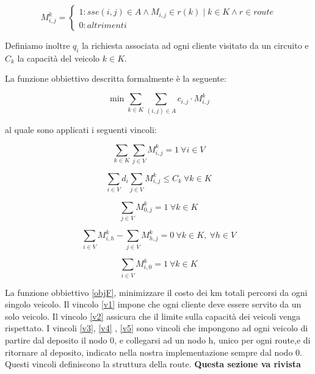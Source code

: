 \documentclass[]{article}
\begin{document}
\[M_{i,j}^k = \left\{
\begin{array}{lr}
1 :sse (i,j) \in A \wedge M_{i,j} \in  r(k) \mid k \in K \wedge r \in route\\
0 :altrimenti
\end{array}
\right.
\]

Definiamo inoltre \emph{$q_{i}$} la richiesta associata ad ogni cliente visitato da un circuito e \emph{$C_{k}$} la capacità del veicolo \emph{$k \in K$}.

La funzione obbiettivo descritta formalmente è la seguente:

\begin{equation} \label{objF}
\min \sum_{k \in K} \sum_{(i,j) \in A} c_{i,j} \cdot M_{i,j}^k 
\end{equation}



al quale sono applicati i seguenti vincoli:

\begin{equation} \label{v1}
 \sum_{k \in K} \sum_{j \in V} M_{i,j}^k = 1 \ \forall i \in V
\end{equation}

\begin{equation} \label{v2}
\sum_{i \in V} d_{i} \sum_{j \in V} M_{i,j}^k \leq C_{k} \ \forall k \in K
\end{equation}

\begin{equation} \label{v3}
\sum_{j \in V} M_{0,j}^k = 1 \ \forall k \in K
\end{equation}

\begin{equation} \label{v4}
\sum_{i \in V} M_{i,h}^k - \sum_{j \in V} M_{h,j}^k = 0 \ \forall k \in K ,\  \forall h \in V
\end{equation}

\begin{equation} \label{v5}
\sum_{i \in V} M_{i,0}^k = 1 \ \forall k \in K
\end{equation}




La funzione obbiettivo \ref{objF}, minimizzare il costo dei km totali percorsi da ogni singolo veicolo.
Il vincolo \ref{v1} impone che ogni cliente deve essere servito da un solo veicolo.
Il vincolo \ref{v2} assicura che il limite sulla capacità dei veicoli venga rispettato.
I vincoli \ref{v3}, \ref{v4} , \ref{v5} sono vincoli che impongono ad ogni veicolo di partire dal deposito il nodo 0, e collegarsi ad un nodo h, unico per ogni route,e di ritornare al deposito, indicato nella nostra implementazione sempre dal nodo 0. Questi vincoli definiscono la struttura della route.
\textbf{Questa sezione va rivista }
\end{document}
